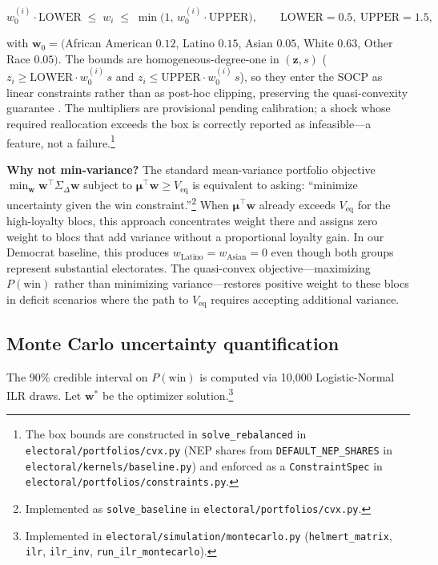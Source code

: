 \documentclass[12pt, letterpaper]{article}
\theoremstyle{definition}
\newcommand{\Veq}{V_{\mathrm{eq}}}
\newcommand{\SigmaDelta}{\Sigma_{\Delta}}
\newcommand{\boldw}{\mathbf{w}}
\newcommand{\boldmu}{\boldsymbol{\mu}}
\begin{document}
\begin{equation}
  w_0^{(i)} \cdot \text{LOWER} \;\leq\; w_i \;\leq\; \min\!\bigl(1,\, w_0^{(i)} \cdot \text{UPPER}\bigr),
  \qquad \text{LOWER} = 0.5,\ \text{UPPER} = 1.5,
  \label{eq:box}
\end{equation}

with $\mathbf{w}_0 = ($African American $0.12$, Latino $0.15$, Asian $0.05$, White
$0.63$, Other Race $0.05)$. The bounds are homogeneous-degree-one in $(\mathbf{z}, s)$
($z_i \geq \text{LOWER}\cdot w_0^{(i)}\, s$ and $z_i \leq \text{UPPER}\cdot w_0^{(i)}\, s$),
so they enter the SOCP as linear constraints rather than as post-hoc clipping, preserving
the quasi-convexity guarantee \citep{Lobo1998}. The multipliers are provisional pending
calibration; a shock whose required reallocation exceeds the box is correctly reported as
infeasible---a feature, not a failure.\footnote{The box bounds are constructed in
\texttt{solve\_rebalanced} in \texttt{electoral/portfolios/cvx.py} (NEP shares from
\texttt{DEFAULT\_NEP\_SHARES} in \texttt{electoral/kernels/baseline.py}) and enforced as
a \texttt{ConstraintSpec} in \texttt{electoral/portfolios/constraints.py}.}

\textbf{Why not min-variance?} The standard mean-variance portfolio objective
$\min_\boldw \boldw^\top \SigmaDelta \boldw$ subject to $\boldmu^\top \boldw
\geq \Veq$ is equivalent to asking: ``minimize uncertainty given the win
constraint.''\footnote{Implemented as \texttt{solve\_baseline} in
\texttt{electoral/portfolios/cvx.py}.} When $\boldmu^\top \boldw$ already exceeds $\Veq$ for the
high-loyalty blocs, this approach concentrates weight there and assigns zero
weight to blocs that add variance without a proportional loyalty gain.
In our Democrat baseline, this produces $w_{\text{Latino}} = w_{\text{Asian}} = 0$
even though both groups represent substantial electorates. The quasi-convex
objective---maximizing $P(\text{win})$ rather than minimizing variance---restores
positive weight to these blocs in deficit scenarios where the path to $\Veq$
requires accepting additional variance.

\subsection{Monte Carlo uncertainty quantification}
\label{sec:mc}

The 90\% credible interval on $P(\text{win})$ is computed via 10,000
Logistic-Normal ILR draws. Let $\boldw^*$ be the optimizer
solution.\footnote{Implemented in \texttt{electoral/simulation/montecarlo.py}
(\texttt{helmert\_matrix}, \texttt{ilr}, \texttt{ilr\_inv},
\texttt{run\_ilr\_montecarlo}).}
\end{document}
